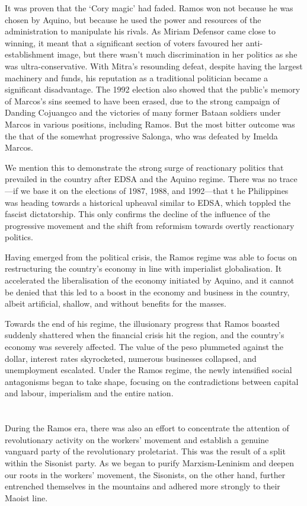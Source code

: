 It was proven that the `Cory magic' had faded. 
Ramos won not because he was chosen by Aquino, 
but because he used the power and resources of the administration 
to manipulate his rivals.
As Miriam Defensor came close to winning, 
it meant that a significant section of voters favoured 
her anti-establishment image, 
but there wasn't much discrimination in her politics 
as she was ultra-conservative. 
With Mitra's resounding defeat, 
despite having the largest machinery and funds, 
his reputation as a traditional politician became a significant disadvantage. 
The 1992 election also showed that the public's memory of Marcos's sins 
seemed to have been erased, 
due to the strong campaign of Danding Cojuangco 
and the victories of many former Bataan soldiers 
under Marcos in various positions, including Ramos. 
But the most bitter outcome was the that of the somewhat progressive Salonga, 
who was defeated by Imelda Marcos.

We mention this to demonstrate the strong surge of reactionary politics 
that prevailed in the country after EDSA and the Aquino regime. 
There was no trace---if we base it on the elections 
of 1987, 1988, and 1992---that t
he Philippines was heading towards a historical upheaval 
similar to EDSA, which toppled the fascist dictatorship. 
This only confirms the decline of the influence of the progressive movement 
and the shift from reformism towards overtly reactionary politics.

Having emerged from the political crisis, 
the Ramos regime was able to focus on restructuring the country's economy 
in line with imperialist globalisation. 
It accelerated the liberalisation of the economy initiated by Aquino, 
and it cannot be denied that this led 
to a boost in the economy and business in the country, 
albeit artificial, shallow, and without benefits for the masses.

Towards the end of his regime, 
the illusionary progress that Ramos boasted suddenly shattered 
when the financial crisis hit the region, 
and the country's economy was severely affected.
The value of the peso plummeted against the dollar, 
interest rates skyrocketed, 
numerous businesses collapsed, 
and unemployment escalated. 
Under the Ramos regime, the newly intensified social antagonisms 
began to take shape, focusing on the contradictions between capital and labour, 
imperialism and the entire nation.


\section{}
During the Ramos era, 
there was also an effort to concentrate the attention of revolutionary activity 
on the workers' movement and establish a genuine vanguard party 
of the revolutionary proletariat. 
This was the result of a split within the Sisonist party. 
As we began to purify Marxism-Leninism and deepen our roots 
in the workers' movement, the Sisonists, on the other hand, further entrenched 
themselves in the mountains and adhered more strongly to their Maoist line.

